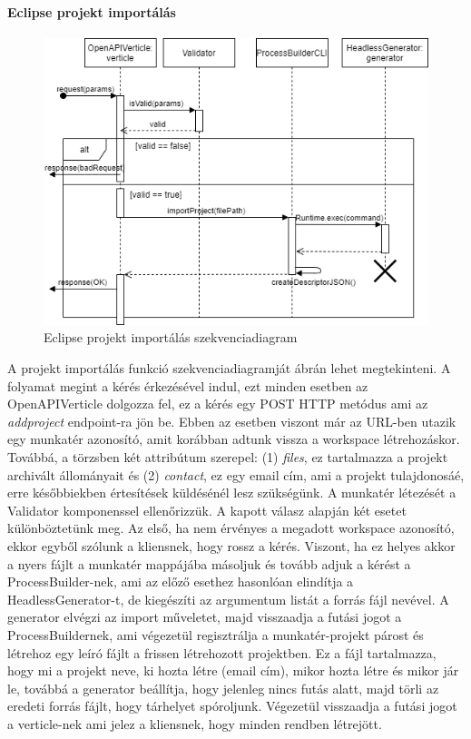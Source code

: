 \paragraph{Eclipse projekt importálás}
\begin{figure}[!ht]
	\includegraphics[width=150mm, keepaspectratio]{figures/add_eclipseproject_seq.png}
	\caption{Eclipse projekt importálás szekvenciadiagram}
	\label{fig:addproject}
\end{figure}

A projekt importálás funkció szekvenciadiagramját  ábrán lehet megtekinteni. A folyamat megint a kérés érkezésével indul, ezt minden esetben az OpenAPIVerticle dolgozza fel, ez a kérés egy POST HTTP metódus ami az \textit{addproject} endpoint-ra jön be. Ebben az esetben viszont már az URL-ben utazik egy munkatér azonosító, amit korábban adtunk vissza a workspace létrehozáskor. Továbbá, a törzsben két attribútum szerepel: (1) \textit{files}, ez tartalmazza a projekt archivált állományait és (2) \textit{contact}, ez egy email cím, ami a projekt tulajdonosáé, erre későbbiekben értesítések küldésénél lesz szükségünk. A munkatér létezését a Validator komponenssel ellenőrizzük. A kapott válasz alapján két esetet különböztetünk meg. Az első, ha nem érvényes a megadott workspace azonosító, ekkor egyből szólunk a kliensnek, hogy rossz a kérés. Viszont, ha ez helyes akkor a nyers fájlt a munkatér mappájába másoljuk és tovább adjuk a kérést a ProcessBuilder-nek, ami az előző esethez hasonlóan elindítja a HeadlessGenerator-t, de kiegészíti az argumentum listát a forrás fájl nevével. A generator elvégzi az import műveletet, majd visszaadja a futási jogot a ProcessBuildernek, ami végezetül regisztrálja a munkatér-projekt párost és létrehoz egy leíró fájlt a frissen létrehozott projektben. Ez a fájl tartalmazza, hogy mi a projekt neve, ki hozta létre (email cím), mikor hozta létre és mikor jár le, továbbá a generator  beállítja, hogy jelenleg nincs futás alatt, majd törli az eredeti forrás fájlt, hogy tárhelyet spóroljunk. Végezetül visszaadja a futási jogot a verticle-nek ami jelez a kliensnek, hogy minden rendben létrejött.



